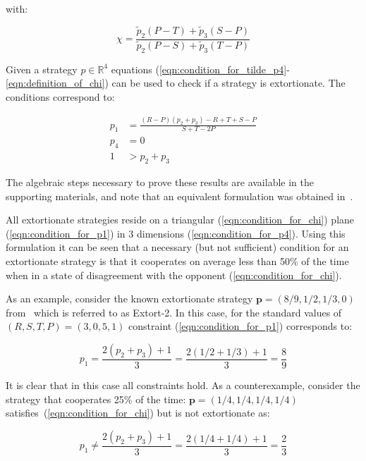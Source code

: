 \documentclass[a4paper]{article}
\begin{document}
with:

\begin{equation}\label{eqn:definition_of_chi}
    \chi = \frac{\tilde p_2 (P - T) + \tilde p_3 (S - P)}
                {\tilde p_2 (P - S) + \tilde p_3 (T - P)}
\end{equation}

Given a strategy \(p\in\mathbb{R}^{4}\) equations
(\ref{eqn:condition_for_tilde_p4}-\ref{eqn:definition_of_chi}) can be used to
check if a strategy is extortionate. The conditions correspond to:

\begin{align}
    p_1 & = \frac{(R-P)(p_2 + p_3) - R + T + S - P}{S + T - 2P}
     \label{eqn:condition_for_p1}\\
    p_4 & = 0 \label{eqn:condition_for_p4}\\
    1 & > p_2 + p_3\label{eqn:condition_for_chi}
\end{align}

The algebraic steps necessary to prove these results are available in the
supporting materials, and note that an equivalent formulation was obtained
in~\cite{adami2013evolutionary}.

All extortionate strategies reside on a triangular (\ref{eqn:condition_for_chi})
plane (\ref{eqn:condition_for_p1}) in 3 dimensions (\ref{eqn:condition_for_p4}).
Using this formulation it can be seen that a necessary (but not sufficient)
condition for an extortionate strategy is that it cooperates on average less
than 50\% of the time when in a state of disagreement with the opponent
(\ref{eqn:condition_for_chi}).

As an example, consider the known extortionate strategy \(\textbf{p}=(8 / 9, 1 / 2, 1 /
3, 0)\) from~\cite{Stewart2012} which is referred to as Extort-2. In
this case, for the standard values of \((R, S, T, P) = (3, 0, 5, 1)\)
constraint (\ref{eqn:condition_for_p1}) corresponds to:

\begin{equation}
    p_1 = \frac{2(p_2 + p_3) + 1}{3}
        = \frac{2(1 / 2 + 1 / 3) + 1}{3}
        = \frac{8}{9}
\end{equation}

It is clear that in this case all constraints hold. As a counterexample,
consider the strategy that cooperates 25\% of the time: \(\textbf{p}=(1 /4, 1 / 4, 1 / 4,
1 / 4)\) satisfies~(\ref{eqn:condition_for_chi}) but is not extortionate as:

\begin{equation}
    p_1 \ne \frac{2(p_2 + p_3) + 1}{3}
        = \frac{2(1 / 4 + 1 / 4) + 1}{3}
        = \frac{2}{3}
\end{equation}
\end{document}
